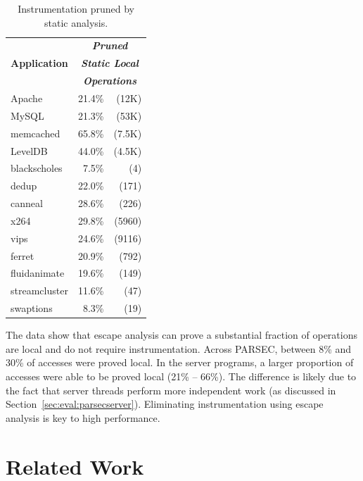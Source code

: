 \documentclass[preprint,9pt]{sigplanconf}
\begin{document}
\begin{table}
\centering
\small
\begin{tabular}{l | r r }
\multirow{3}{*}{\bf Application} & \multicolumn{2}{c}{\bf \em Pruned } \\
               & \multicolumn{2}{c}{\bf \em Static Local}  \\ 
               & \multicolumn{2}{c}{\bf \em Operations}    \\ \hline


Apache         &  21.4\%&(12K)                    \\
MySQL          &  21.3\%&(53K)                    \\
memcached      &  65.8\%&(7.5K)                   \\
LevelDB        &  44.0\%&(4.5K)                   \\ \hline
blackscholes   &   7.5\%&(4)                      \\
dedup          &   22.0\%&(171)                   \\
canneal        &   28.6\%&(226)                   \\
x264           &   29.8\%&(5960)                  \\
vips           &   24.6\%&(9116)                  \\
ferret         &   20.9\%&(792)                   \\
fluidanimate   &   19.6\%&(149)                   \\
streamcluster  &   11.6\%&(47)                    \\
swaptions      &   8.3\% &(19)                    \\
\end{tabular}
\caption{\label{tab:char}Instrumentation pruned by static analysis.}
\end{table}

The data show that escape analysis can prove a substantial fraction of
operations are local and do not require instrumentation.  Across PARSEC,
between 8\% and 30\% of accesses were proved local.  In the server programs, a
larger proportion of accesses were able to be proved local (21\% -- 66\%).  The
difference is likely due to the fact that server threads perform more
independent work (as discussed in Section~\ref{sec:eval:parsecserver}).
Eliminating instrumentation using escape analysis is key to high performance.  


\section{Related Work}
\end{document}
